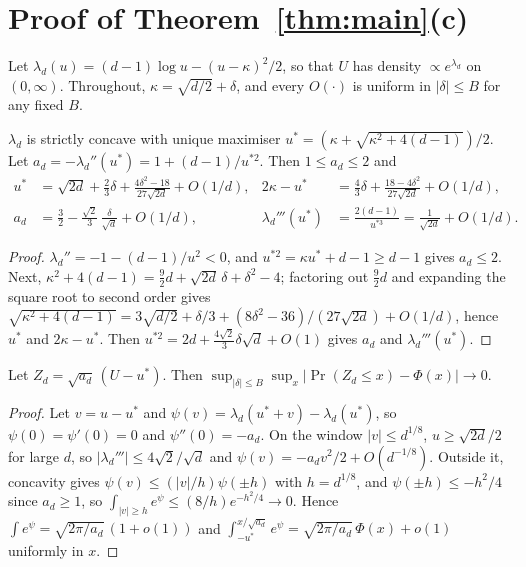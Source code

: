 \section{Proof of Theorem~\ref{thm:main}(c)}\label{app:c}

Let $\lambda_d(u) = (d-1)\log u - (u - \kappa)^2/2$, so that $U$ has density $\propto e^{\lambda_d}$ on $(0, \infty)$. Throughout,
$\kappa = \sqrt{d/2} + \delta$, and every $O(\cdot)$ is uniform in $|\delta| \le B$ for any fixed $B$.

\begin{lemma}\label{lem:mode}
$\lambda_d$ is strictly concave with unique maximiser $u^* = (\kappa + \sqrt{\kappa^2 + 4(d-1)})/2$. Let
$a_d = -\lambda_d''(u^*) = 1 + (d-1)/u^{*2}$. Then $1 \le a_d \le 2$ and
\begin{align*}
u^* &= \sqrt{2d} + \tfrac23\delta + \frac{4\delta^2 - 18}{27\sqrt{2d}} + O(1/d), &
2\kappa - u^* &= \tfrac43\delta + \frac{18 - 4\delta^2}{27\sqrt{2d}} + O(1/d),\\
a_d &= \tfrac32 - \frac{\sqrt2}{3}\,\frac{\delta}{\sqrt d} + O(1/d), &
\lambda_d'''(u^*) &= \frac{2(d-1)}{u^{*3}} = \frac{1}{\sqrt{2d}} + O(1/d).
\end{align*}
\end{lemma}

\begin{proof}
$\lambda_d'' = -1 - (d-1)/u^2 < 0$, and $u^{*2} = \kappa u^* + d - 1 \ge d - 1$ gives $a_d \le 2$. Next,
$\kappa^2 + 4(d-1) = \tfrac92 d + \sqrt{2d}\,\delta + \delta^2 - 4$; factoring out $\tfrac92 d$ and expanding the square
root to second order gives $\sqrt{\kappa^2 + 4(d-1)} = 3\sqrt{d/2} + \delta/3 + (8\delta^2 - 36)/(27\sqrt{2d}) + O(1/d)$,
hence $u^*$ and $2\kappa - u^*$. Then $u^{*2} = 2d + \tfrac{4\sqrt2}{3}\delta\sqrt d + O(1)$ gives $a_d$ and
$\lambda_d'''(u^*)$.
\end{proof}

\begin{lemma}[Laplace]\label{lem:laplace}
Let $Z_d = \sqrt{a_d}\,(U - u^*)$. Then $\sup_{|\delta| \le B}\sup_x|\Pr(Z_d \le x) - \Phi(x)| \to 0$.
\end{lemma}

\begin{proof}
Let $v = u - u^*$ and $\psi(v) = \lambda_d(u^* + v) - \lambda_d(u^*)$, so $\psi(0) = \psi'(0) = 0$ and $\psi''(0) = -a_d$. On
the window $|v| \le d^{1/8}$, $u \ge \sqrt{2d}/2$ for large $d$, so $|\lambda_d'''| \le 4\sqrt2/\sqrt d$ and
$\psi(v) = -a_dv^2/2 + O(d^{-1/8})$. Outside it, concavity gives $\psi(v) \le (|v|/h)\psi(\pm h)$ with $h = d^{1/8}$, and
$\psi(\pm h) \le -h^2/4$ since $a_d \ge 1$, so $\int_{|v| \ge h} e^\psi \le (8/h)e^{-h^2/4} \to 0$. Hence
$\int e^\psi = \sqrt{2\pi/a_d}\,(1 + o(1))$ and $\int_{-u^*}^{x/\sqrt{a_d}} e^\psi = \sqrt{2\pi/a_d}\,\Phi(x) + o(1)$
uniformly in $x$.
\end{proof}

